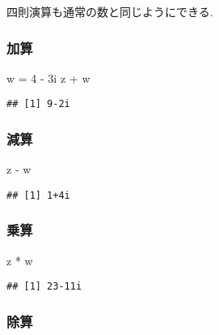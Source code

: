 \documentclass[a4paper]{scrbook}
\newenvironment{Shaded}{\begin{snugshade}}{\end{snugshade}}
\newcommand{\DecValTok}[1]{\textcolor[rgb]{0.00,0.00,0.81}{{#1}}}
\newcommand{\StringTok}[1]{\textcolor[rgb]{0.31,0.60,0.02}{{#1}}}
\newcommand{\NormalTok}[1]{{#1}}
\theoremstyle{definition}
\begin{document}
四則演算も通常の数と同じようにできる.

\subsubsection*{加算}

\begin{Shaded}
\begin{Highlighting}[]
\NormalTok{w =}\StringTok{ }\DecValTok{4} \NormalTok{-}\StringTok{ }\NormalTok{3i}
\NormalTok{z +}\StringTok{ }\NormalTok{w }
\end{Highlighting}
\end{Shaded}

\begin{verbatim}
## [1] 9-2i
\end{verbatim}

\subsubsection*{減算}

\begin{Shaded}
\begin{Highlighting}[]
\NormalTok{z -}\StringTok{ }\NormalTok{w}
\end{Highlighting}
\end{Shaded}

\begin{verbatim}
## [1] 1+4i
\end{verbatim}

\subsubsection*{乗算}

\begin{Shaded}
\begin{Highlighting}[]
\NormalTok{z *}\StringTok{ }\NormalTok{w}
\end{Highlighting}
\end{Shaded}

\begin{verbatim}
## [1] 23-11i
\end{verbatim}

\subsubsection*{除算}
\end{document}
